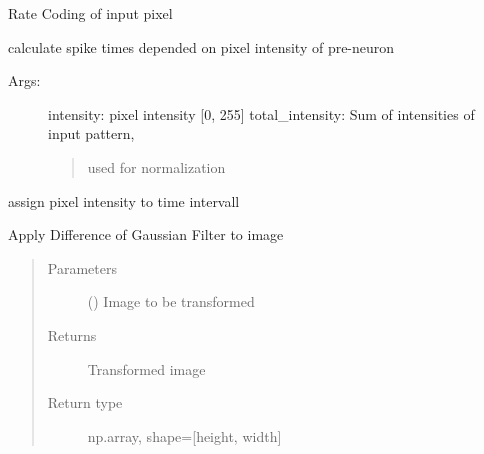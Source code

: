 \documentclass[letterpaper,10pt,english]{sphinxmanual}
\begin{document}

\begin{fulllineitems}
\label{\detokenize{SpikingConvNet:SpikingConvNet.utils.convert_rate_code}}
Rate Coding of input pixel

calculate spike times depended on pixel intensity of pre-neuron
\begin{description}
\item[{Args:}] \leavevmode
intensity: pixel intensity {[}0, 255{]}
total\_intensity: Sum of intensities of input pattern,
\begin{quote}

used for normalization
\end{quote}

\end{description}

\end{fulllineitems}


\begin{fulllineitems}
\label{\detokenize{SpikingConvNet:SpikingConvNet.utils.convert_time_code}}
assign pixel intensity to time intervall

\end{fulllineitems}


\begin{fulllineitems}
\label{\detokenize{SpikingConvNet:SpikingConvNet.utils.dog_filter}}
Apply Difference of Gaussian Filter to image
\begin{quote}\begin{description}
\item[{Parameters}] \leavevmode
{} () \textendash{} Image to be transformed

\item[{Returns}] \leavevmode
{} \textendash{} Transformed image

\item[{Return type}] \leavevmode
np.array, shape={[}height, width{]}

\end{description}\end{quote}

\end{fulllineitems}
\end{document}
